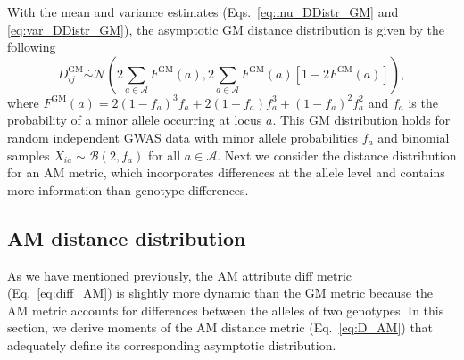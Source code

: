 \documentclass[aos]{imsart}
\begin{document}
With the mean and variance estimates (Eqs.~\ref{eq:mu_DDistr_GM} and \ref{eq:var_DDistr_GM}), the asymptotic GM distance distribution is given by the following
%
\begin{equation}\label{eq:DDistr_GM}
D^\text{GM}_{ij} \overset{.}{\sim} \mathcal{N}\left(2\sum_{a \in \mathcal{A}} F^\text{GM}(a), 2\sum_{a \in \mathcal{A}} F^\text{GM}(a)[1 - 2F^\text{GM}(a)]\right),
\end{equation}
%
where $F^\text{GM}(a) = 2(1 - f_a)^3f_a + 2(1 - f_a)f^3_a + (1 - f_a)^2f^2_a$ and $f_a$ is the probability of a minor allele occurring at locus $a$. This GM distribution holds for random independent GWAS data with minor allele probabilities $f_a$ and binomial samples $X_{ia} \sim \mathcal{B}(2,f_a)$ for all $a \in \mathcal{A}$. Next we consider the distance distribution for an AM metric, which incorporates differences at the allele level and contains more information than genotype differences.

\subsection{AM distance distribution}

As we have mentioned previously, the AM attribute diff metric (Eq.~\ref{eq:diff_AM}) is slightly more dynamic than the GM metric because the AM metric accounts for differences between the alleles of two genotypes. In this section, we derive moments of the AM distance metric (Eq.~\ref{eq:D_AM}) that adequately define its corresponding asymptotic distribution.
\end{document}
